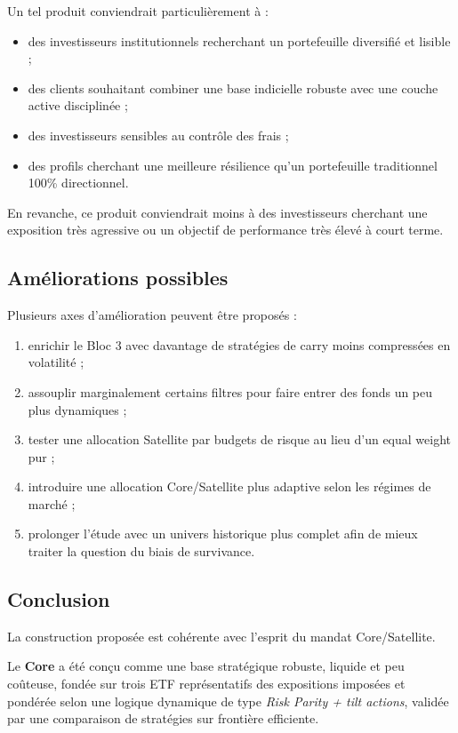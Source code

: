 \documentclass{article}
\begin{document}
Un tel produit conviendrait particulièrement à :
\begin{itemize}
    \item des investisseurs institutionnels recherchant un portefeuille diversifié et lisible ;
    \item des clients souhaitant combiner une base indicielle robuste avec une couche active disciplinée ;
    \item des investisseurs sensibles au contrôle des frais ;
    \item des profils cherchant une meilleure résilience qu’un portefeuille traditionnel 100\% directionnel.
\end{itemize}

En revanche, ce produit conviendrait moins à des investisseurs cherchant une exposition très agressive ou un objectif de performance très élevé à court terme.

\subsection{Améliorations possibles}

Plusieurs axes d’amélioration peuvent être proposés :
\begin{enumerate}
    \item enrichir le Bloc 3 avec davantage de stratégies de carry moins compressées en volatilité ;
    \item assouplir marginalement certains filtres pour faire entrer des fonds un peu plus dynamiques ;
    \item tester une allocation Satellite par budgets de risque au lieu d’un equal weight pur ;
    \item introduire une allocation Core/Satellite plus adaptive selon les régimes de marché ;
    \item prolonger l’étude avec un univers historique plus complet afin de mieux traiter la question du biais de survivance.
\end{enumerate}

\subsection{Conclusion}

La construction proposée est cohérente avec l’esprit du mandat Core/Satellite.

Le \textbf{Core} a été conçu comme une base stratégique robuste, liquide et peu coûteuse, fondée sur trois ETF représentatifs des expositions imposées et pondérée selon une logique dynamique de type \textit{Risk Parity + tilt actions}, validée par une comparaison de stratégies sur frontière efficiente.
\end{document}
